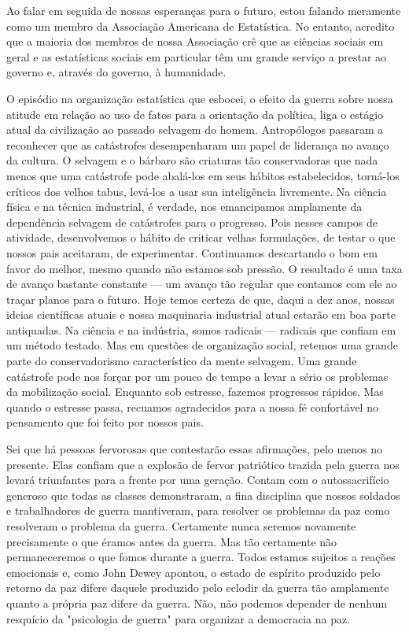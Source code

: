 \documentclass[12pt]{article}
\begin{document}
Ao falar em seguida de nossas esperanças para o futuro, estou falando meramente como um membro da Associação Americana de Estatística. No entanto, acredito que a maioria dos membros de nossa Associação crê que as ciências sociais em geral e as estatísticas sociais em particular têm um grande serviço a prestar ao governo e, através do governo, à humanidade.

O episódio na organização estatística que esbocei, o efeito da guerra sobre nossa atitude em relação ao uso de fatos para a orientação da política, liga o estágio atual da civilização ao passado selvagem do homem. Antropólogos passaram a reconhecer que as catástrofes desempenharam um papel de liderança no avanço da cultura. O selvagem e o bárbaro são criaturas tão conservadoras que nada menos que uma catástrofe pode abalá-los em seus hábitos estabelecidos, torná-los críticos dos velhos tabus, levá-los a usar sua inteligência livremente. Na ciência física e na técnica industrial, é verdade, nos emancipamos amplamente da dependência selvagem de catástrofes para o progresso. Pois nesses campos de atividade, desenvolvemos o hábito de criticar velhas formulações, de testar o que nossos pais aceitaram, de experimentar. Continuamos descartando o bom em favor do melhor, mesmo quando não estamos sob pressão. O resultado é uma taxa de avanço bastante constante — um avanço tão regular que contamos com ele ao traçar planos para o futuro. Hoje temos certeza de que, daqui a dez anos, nossas ideias científicas atuais e nossa maquinaria industrial atual estarão em boa parte antiquadas. Na ciência e na indústria, somos radicais — radicais que confiam em um método testado. Mas em questões de organização social, retemos uma grande parte do conservadorismo característico da mente selvagem. Uma grande catástrofe pode nos forçar por um pouco de tempo a levar a sério os problemas da mobilização social. Enquanto sob estresse, fazemos progressos rápidos. Mas quando o estresse passa, recuamos agradecidos para a nossa fé confortável no pensamento que foi feito por nossos pais.

Sei que há pessoas fervorosas que contestarão essas afirmações, pelo menos no presente. Elas confiam que a explosão de fervor patriótico trazida pela guerra nos levará triunfantes para a frente por uma geração. Contam com o autossacrifício generoso que todas as classes demonstraram, a fina disciplina que nossos soldados e trabalhadores de guerra mantiveram, para resolver os problemas da paz como resolveram o problema da guerra. Certamente nunca seremos novamente precisamente o que éramos antes da guerra. Mas tão certamente não permaneceremos o que fomos durante a guerra. Todos estamos sujeitos a reações emocionais e, como John Dewey apontou, o estado de espírito produzido pelo retorno da paz difere daquele produzido pelo eclodir da guerra tão amplamente quanto a própria paz difere da guerra. Não, não podemos depender de nenhum resquício da "psicologia de guerra" para organizar a democracia na paz.
\end{document}
